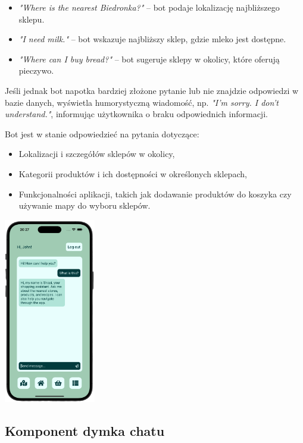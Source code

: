 \begin{itemize}
    \item \emph{"Where is the nearest Biedronka?"} – bot podaje lokalizację najbliższego sklepu.  
    \item \emph{"I need milk."} – bot wskazuje najbliższy sklep, gdzie mleko jest dostępne.  
    \item \emph{"Where can I buy bread?"} – bot sugeruje sklepy w okolicy, które oferują pieczywo.  
\end{itemize}  

Jeśli jednak bot napotka bardziej złożone pytanie lub nie znajdzie odpowiedzi w bazie danych, wyświetla humorystyczną wiadomość, np. \emph{"I'm sorry. I don't understand."}, informując użytkownika o braku odpowiednich informacji.  

Bot jest w stanie odpowiedzieć na pytania dotyczące:  
\begin{itemize}
    \item Lokalizacji i szczegółów sklepów w okolicy,  
    \item Kategorii produktów i ich dostępności w określonych sklepach,  
    \item Funkcjonalności aplikacji, takich jak dodawanie produktów do koszyka czy używanie mapy do wyboru sklepów.  
\end{itemize}  

\begin{center}
    \includegraphics[width=0.3\textwidth]{images/front/what.png}
\end{center}

\subsection{Komponent dymka chatu}

